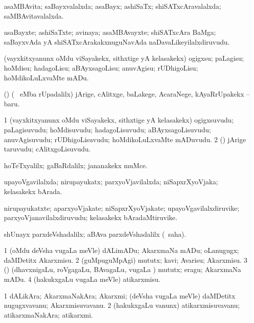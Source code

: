 \bentry
{}
\gl{\gu}
\bmng
asaMBAvita; saBayxvalalxda; asaBayx; ashiSaTx; shiSATxcAravalalxda; saMBAvitavalalxda. 
\emng
\eentry

\bentry
{}
\gl{\nA}
\bmng
asaBayxte; ashiSaTxte; avinaya; asaMBAvayxte; shiSATxcAra BaMga; saBayxvAda yA shiSATxcArakakxnuguNavAda naDavaLikeyilalxdiruvudu. 
\emng
\eentry

\bentry
{}
\gl{\sakirx}
\bmng
(vayxkitxyanunx oMdu viSayakekx, sithxtige yA kelasakekx) ogigxsu; paLagisu; hoMdisu; hadagoLisu; aBAyxsagoLisu; anuvAgisu; rUDhigoLisu; hoMdikoLuLxvaMte mADu. 
\emng

\noindent 
\gl{\akirx}
\bmng
(\nAyxshA) (\sA\  eMba rUpadalilx) jArige, cAlitxge, baLakege, AcaraNege, kAyaRrUpakekx -- baru. 
\emng
\eentry

\bentry
{}
\gl{\nA}
\bmng
\bnum
\num{1} (vayxkitxyanunx oMdu viSayakekx, sithxtige yA kelasakekx) ogigxsuvudu; paLagisuvudu; hoMdisuvudu; hadagoLisuvudu; aBAyxsagoLisuvudu; anuvAgisuvudu; rUDhigoLisuvudu; hoMdikoLuLxvaMte mADuvudu. 
\num{2} (\nAyxshA) jArige taruvudu; cAlitxgoLisuvudu. 
\enum
\emng
\eentry

\bentry
{}
\gl{\kirxvi}
\expl{\Latin }
\bmng
hoTeTxyalilx; gaBaRdalilx; jananakekx muMce. 
\emng
\eentry

\bentry
{}
\gl{\gu}
\bmng
upayoVgavilalxda; nirupayukatx; parxyoVjavilalxda; niSapxrXyoVjaka; kelasakekx bArada. 
\emng
\eentry

\bentry
{}
\gl{\nA}
\bmng
nirupayukatxte; aparxyoVjakate; niSapxrXyoVjakate; upayoVgavilalxdiruvike; parxyoVjanavilalxdiruvudu; kelasakekx bAradaMtiruvike. 
\emng
\eentry

\bentry
{}
\gl{\kirxvi}
\expl{\Latin }
\bmng
shUnayx parxdeVshadalilx; aBAva parxdeVshadalilx (\rUpa\ saha). 
\emng
\eentry

\bentry
{}
\gl{\sakirx}
\bmng
\bnum
\num{1} (oMdu deVsha \mo vugaLa meVle) dALimADu; AkarxmaNa mADu; oLanugugx; daMDetitx Akarxmisu. 
\num{2} (guMpuguMpAgi) mututx; kavi; Avarisu; Akarxmisu. 
\num{3} (\rUpa) (dhavxnigaLu, roVgagaLu, BAvagaLu, \mo vugaLa \vi) mututx; eragu; AkarxmaNa mADu. 
\num{4} (hakukxgaLu \mo vugaLa meVle) atikarxmisu. 
\enum
\emng
\eentry

\bentry
{}
\gl{\nA}
\bmng
\bnum
\num{1} dALikAra; AkarxmaNakAra; Akarxmi; (deVsha \mo vugaLa meVle) daMDetitx nugugxvavanu; Akarxmisuvavanu. 
\num{2} (hakukxgaLu \mo vanunx) atikarxmisuvavanu; atikarxmaNakAra; atikarxmi. 
\enum
\emng
\eentry

